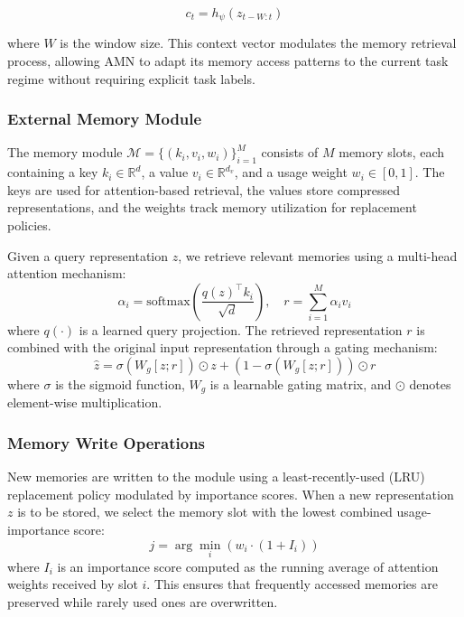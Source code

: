 \documentclass[11pt]{article}
\begin{document}
\begin{equation}
    c_t = h_\psi(z_{t-W:t})
\end{equation}

where $W$ is the window size. This context vector modulates the memory retrieval process, allowing AMN to adapt its memory access patterns to the current task regime without requiring explicit task labels.

\subsubsection{External Memory Module}

The memory module $\mathcal{M} = \{(k_i, v_i, w_i)\}_{i=1}^{M}$ consists of $M$ memory slots, each containing a key $k_i \in \mathbb{R}^d$, a value $v_i \in \mathbb{R}^{d_v}$, and a usage weight $w_i \in [0, 1]$. The keys are used for attention-based retrieval, the values store compressed representations, and the weights track memory utilization for replacement policies.

Given a query representation $z$, we retrieve relevant memories using a multi-head attention mechanism:
\begin{equation}
    \alpha_i = \text{softmax}\left(\frac{q(z)^\top k_i}{\sqrt{d}}\right), \quad r = \sum_{i=1}^{M} \alpha_i v_i
\end{equation}
where $q(\cdot)$ is a learned query projection. The retrieved representation $r$ is combined with the original input representation through a gating mechanism:
\begin{equation}
    \hat{z} = \sigma(W_g [z; r]) \odot z + (1 - \sigma(W_g [z; r])) \odot r
\end{equation}
where $\sigma$ is the sigmoid function, $W_g$ is a learnable gating matrix, and $\odot$ denotes element-wise multiplication.

\subsubsection{Memory Write Operations}

New memories are written to the module using a least-recently-used (LRU) replacement policy modulated by importance scores. When a new representation $z$ is to be stored, we select the memory slot with the lowest combined usage-importance score:
\begin{equation}
    j = \arg\min_i \left( w_i \cdot (1 + I_i) \right)
\end{equation}
where $I_i$ is an importance score computed as the running average of attention weights received by slot $i$. This ensures that frequently accessed memories are preserved while rarely used ones are overwritten.
\end{document}
